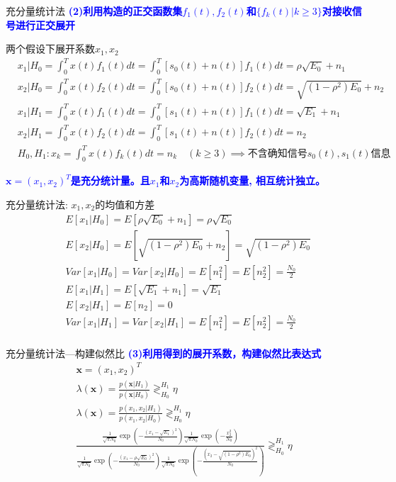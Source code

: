 \begin{frame}[shrink]{充分量统计法}
\textbf{\textcolor{blue}{(2)利用构造的正交函数集$f_1(t),f_2(t)$和$\{f_k(t)|k\ge 3\}$对接收信号进行正交展开}}
\begin{block}{两个假设下展开系数$x_1,x_2$}
\begin{align*}
&x_1|H_0=\int_{0}^{T}x(t)f_1(t)dt=\int_{0}^{T}[s_0(t)+n(t)]f_1(t)dt=\rho\sqrt{E_0}+n_1\\
&x_2|H_0=\int_{0}^{T}x(t)f_2(t)dt=\int_{0}^{T}[s_0(t)+n(t)]f_2(t)dt=\sqrt{(1-\rho^2)E_0}+n_2\\
&x_1|H_1=\int_{0}^{T}x(t)f_1(t)dt=\int_{0}^{T}[s_1(t)+n(t)]f_1(t)dt=\sqrt{E_1}+n_1\\
&x_2|H_1=\int_{0}^{T}x(t)f_2(t)dt=\int_{0}^{T}[s_1(t)+n(t)]f_2(t)dt=n_2\\
&H_0,H_1: x_k=\int_{0}^{T}x(t)f_k(t)dt=n_k \quad (k\ge 3)\implies\text{不含确知信号$s_0(t),s_1(t)$信息}
\end{align*}
\end{block}
\textbf{\textcolor{blue}{$\bm{x}=(x_1,x_2)^T$是充分统计量。且$x_1$和$x_2$为高斯随机变量, 相互统计独立。}}
\end{frame}

\begin{frame}[shrink]{充分量统计法: $x_1,x_2$的均值和方差}
\begin{align*}
&E[x_1|H_0]=E\left[\rho\sqrt{E_0}+n_1\right]=\rho\sqrt{E_0}\\
&E[x_2|H_0]=E\left[\sqrt{(1-\rho^2)E_0}+n_2\right]=\sqrt{(1-\rho^2)E_0}\\
&Var[x_1|H_0]=Var[x_2|H_0]=E[n_1^2]=E[n_2^2]=\frac{N_0}{2}\\
&E[x_1|H_1]=E\left[\sqrt{E_1}+n_1\right]=\sqrt{E_1}\\
&E[x_2|H_1]=E[n_2]=0\\
&Var[x_1|H_1]=Var[x_2|H_1]=E[n_1^2]=E[n_2^2]=\frac{N_0}{2}\\
\end{align*}
\end{frame}

\begin{frame}[shrink]{充分量统计法---构建似然比}
\textbf{\textcolor{blue}{(3)利用得到的展开系数，构建似然比表达式
}}
\begin{align*}
\bm{x}=(x_1,x_2)^T\\
\lambda(\bm{x})=\frac{p(\bm{x}|H_1)}{p(\bm{x}|H_0)}\mathop{\gtrless}_{H_0}^{H_1}\eta\\
\lambda(\bm{x})=\frac{p(x_1,x_2|H_1)}{p(x_1,x_2|H_0)}\mathop{\gtrless}_{H_0}^{H_1}\eta\\
\frac{\frac{1}{\sqrt{\pi N_0}}\exp\left(-\frac{\left(x_1-\sqrt{E_1}\right)^2}{N_0}\right)\frac{1}{\sqrt{\pi N_0}}\exp\left(-\frac{x_2^2}{N_0}\right)}
{\frac{1}{\sqrt{\pi N_0}}\exp\left(-\frac{\left(x_1-\rho\sqrt{E_0}\right)^2}{N_0}\right)\frac{1}{\sqrt{\pi N_0}}\exp\left(-\frac{\left(x_2-\sqrt{(1-\rho^2)E_0}\right)^2}{N_0}\right)}
\mathop{\gtrless}_{H_0}^{H_1}\eta
\end{align*}
\end{frame}

